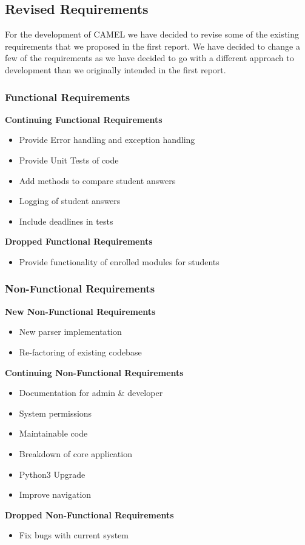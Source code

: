 \subsection{Revised Requirements}
	For the development of CAMEL we have decided to revise some of the existing requirements that we proposed in the first report. We have decided to change a few of the requirements as we have decided to go with a different approach to development than we originally intended in the first report.
	
	\subsubsection{Functional Requirements}
	\textbf{Continuing Functional Requirements}
	\begin{itemize}
		\item Provide Error handling and exception handling
		\item Provide Unit Tests of code
		\item Add methods to compare student answers
		\item Logging of student answers
		\item Include deadlines in tests
	\end{itemize}
	
	\textbf{Dropped Functional Requirements}
	\begin{itemize}
		\item Provide functionality of enrolled modules for students	
	\end{itemize}
		
	\subsubsection{Non-Functional Requirements}
	\textbf{New Non-Functional Requirements}
	\begin{itemize}
		\item New parser implementation
		\item Re-factoring of existing codebase
	\end{itemize}
	
	\textbf{Continuing Non-Functional Requirements}
	\begin{itemize}
		\item Documentation for admin & developer
		\item System permissions
		\item Maintainable code
		\item Breakdown of core application
		\item Python3 Upgrade
		\item Improve navigation
	\end{itemize}
	
	\textbf{Dropped Non-Functional Requirements}
	\begin{itemize}
		\item Fix bugs with current system	
	\end{itemize}
	